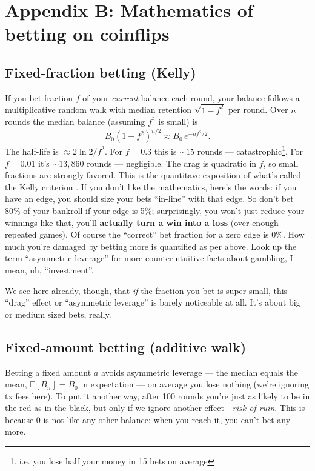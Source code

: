 \documentclass[11pt]{article}
\begin{document}
\clearpage

\section{Appendix B: Mathematics of betting on coinflips}

\subsection{Fixed-fraction betting (Kelly)}

If you bet fraction $f$ of your \emph{current} balance each round, your balance
follows a multiplicative random walk with median retention $\sqrt{1-f^2}$ per
round. Over $n$ rounds the median balance (assuming $f^2$ is small) is
$$
B_0(1-f^2)^{n/2} \approx B_0\, e^{-nf^2/2}.
$$
The half-life is $\approx 2\ln 2 / f^2$. For $f=0.3$ this is $\sim 15$ rounds
--- catastrophic\footnote{i.e. you lose half your money in 15 bets on average}. For $f=0.01$ it's $\sim 13{,}860$ rounds --- negligible.
The drag is quadratic in $f$, so small fractions are strongly favored. This is the quantitave exposition of what's called the Kelly criterion \cite{kelly}. If you don't like the mathematics, here's the words: if you have an edge, you should size your bets ``in-line'' with that edge. So don't bet 80\% of your bankroll if your edge is 5\%; surprisingly, you won't just reduce your winnings like that, you'll \textbf{actually turn a win into a loss} (over enough repeated games). Of course the ``correct'' bet fraction for a zero edge is 0\%. How much you're damaged by betting more is quantified as per above. Look up the term ``asymmetric leverage'' for more counterintuitive facts about gambling, I mean, uh, ``investment''.

We see here already, though, that \emph{if} the fraction you bet is super-small, this ``drag'' effect or ``asymmetric leverage'' is barely noticeable at all. It's about big or medium sized bets, really.

\subsection{Fixed-amount betting (additive walk)}

Betting a fixed amount $a$ avoids asymmetric leverage --- the median equals the mean, $\mathbb{E}[B_n]=B_0$ in expectation --- on average you lose nothing (we're ignoring tx fees here). To put it another way, after 100 rounds you're just as likely to be in the red as in the black, but only if we ignore another effect - \emph{risk of ruin}. This is because 0 is not like any other balance: when you reach it, you can't bet any more.
\end{document}
